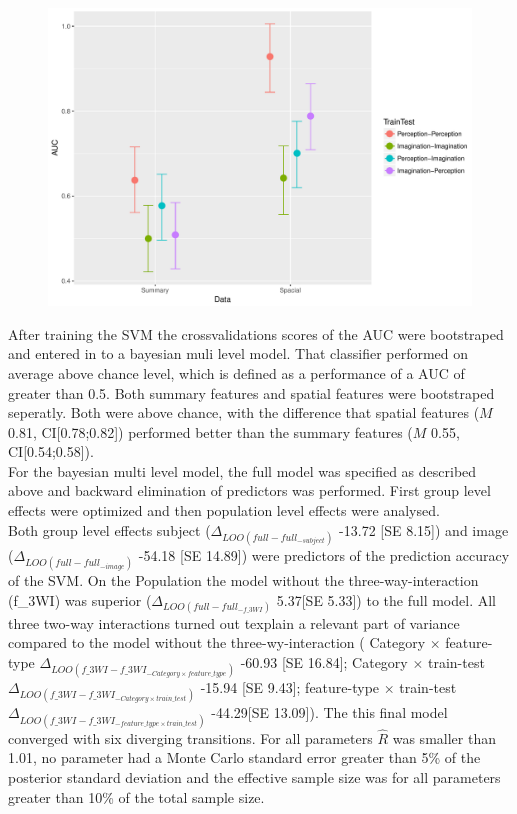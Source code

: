 \documentclass[a4paper,man,natbib,floatsintext]{apa6}
\begin{document}
\begin{figure}
\centering
\includegraphics[width=1\textwidth]{FeatureXTrainTest.pdf}
\caption[Training-Test-Condition $\times$ Features]{\label{fig:FeatureXTrainTest} }
\end{figure}

After training the SVM the crossvalidations scores of the AUC were bootstraped and entered in to a bayesian muli level model.
That classifier performed on average above chance level, which is defined as a performance of a AUC of greater than 0.5. Both summary features and spatial features were bootstraped seperatly. Both were above chance, with the difference that spatial features ($M$ 0.81, CI[0.78;0.82]) performed better than the summary features ($M$ 0.55, CI[0.54;0.58]). \\
For the bayesian multi level model, the full model was specified as described above and backward elimination of predictors was performed. First group level effects were optimized and then population level effects were analysed. \\
Both group level effects subject ($\Delta_{LOO(full - full_{-subject})}$ -13.72 [SE 8.15]) and image ($\Delta_{LOO(full - full_{-image})}$ -54.18 [SE  14.89]) were predictors of the prediction accuracy of the SVM. On the Population the model without the three-way-interaction (f\_3WI) was superior ($\Delta_{LOO(full - full_{-f\_3WI})}$ 5.37[SE 5.33]) to the full model.  All three two-way interactions turned out texplain a relevant part of variance compared to the model without the three-wy-interaction (
Category $\times$ feature-type $\Delta_{LOO(f\_3WI - f\_3WI_{-Category \times feature\_type})}$ -60.93 [SE 16.84]; 
Category $\times$ train-test $\Delta_{LOO(f\_3WI- f\_3WI_{-Category \times train\_test})}$ -15.94 [SE  9.43];
feature-type $\times$ train-test $\Delta_{LOO(f\_3WI- f\_3WI_{- feature\_type\times train\_test})}$ -44.29[SE  13.09]).
The this final model converged with six diverging transitions. For all parameters $\hat{R}$ was smaller than 1.01, no parameter had a Monte Carlo standard error greater than 5\% of the posterior standard deviation and the effective sample size was for all parameters greater than 10\% of the total sample size.\\
\end{document}
